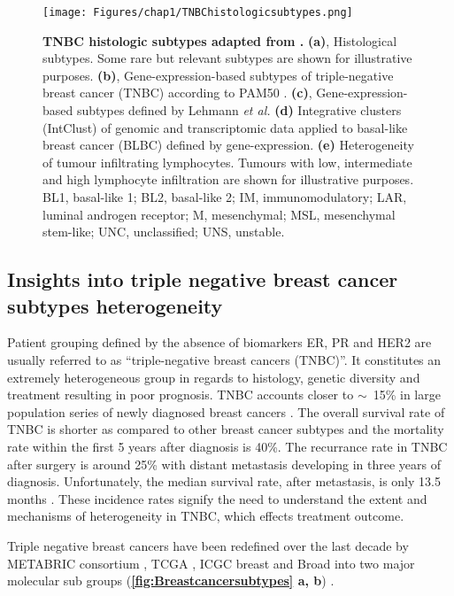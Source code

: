 \begin{figure}
\centering
\texttt{[image: Figures/chap1/TNBChistologicsubtypes.png]}
	\caption[TNBC histologic subtypes adapted from  \cite{bianchini2016triple} ]
	{\small
	    \textbf{TNBC histologic subtypes adapted from \cite{bianchini2016triple}.}
	    \textbf{(a)}, Histological subtypes. Some rare but relevant subtypes are shown for
illustrative purposes.
	    \textbf{(b)}, Gene-expression-based subtypes of triple-negative breast cancer (TNBC) according to PAM50 \cite{prat2013molecular}.
	    \textbf{(c)}, Gene-expression-based subtypes defined by Lehmann \textit{et al.} \cite{lehmann2011identification}
	     \textbf{(d)} Integrative clusters (IntClust) of genomic and transcriptomic data applied to basal-like breast cancer (BLBC) defined by gene-expression.
	     \textbf{(e)} Heterogeneity of tumour infiltrating lymphocytes. Tumours with low, intermediate and high lymphocyte infiltration are shown for illustrative
purposes. BL1, basal-like 1; BL2, basal-like 2; IM, immunomodulatory; LAR, luminal androgen receptor; M, mesenchymal;
MSL, mesenchymal stem-like; UNC, unclassified; UNS, unstable.
	}
	\label{fig:TNBChistologicsubtypes}
\end{figure}
\subsection{Insights into triple negative breast cancer subtypes heterogeneity}
Patient grouping defined by the absence of biomarkers ER, PR and HER2 are usually referred to as ``triple-negative breast cancers (TNBC)''. It constitutes an extremely heterogeneous group in regards to histology, genetic diversity and treatment resulting in poor prognosis. TNBC accounts closer to $\sim$~15\% in large population series of newly diagnosed breast cancers \cite{reis2008triple}.
The overall survival rate of TNBC is shorter as compared to other breast cancer subtypes and the mortality rate within the first 5 years after diagnosis is 40\%. The recurrance rate in TNBC after surgery is  around 25\% with distant metastasis developing in three years of diagnosis. Unfortunately, the median survival rate, after metastasis, is only 13.5 months \cite{dent2007triple,lin2008sites}. These incidence rates signify the need to understand the extent and mechanisms of heterogeneity in TNBC, which effects treatment outcome. 

Triple negative breast cancers have been redefined over the last decade by METABRIC consortium \cite{curtis2012genomic, dvinge2013shaping, pereira2016somatic, dawson2013new, bilal2013improving}, TCGA \cite{weinstein2013cancer}, ICGC breast \cite{international2010international} and Broad \cite{banerji2012sequence, rheinbay2017recurrent} into two major molecular sub groups (\textbf{\autoref{fig:Breastcancersubtypes} a, b}) \cite{xu2014omics}.

